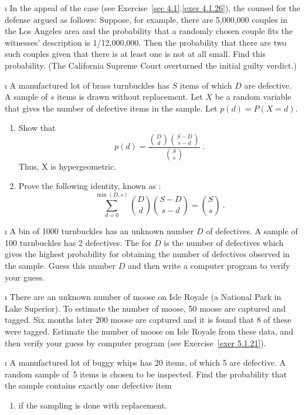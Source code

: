 \begin{LJSItem}
\i\label{exer 9.2.23} In the appeal of the   case (see Exercise~\ref{sec 4.1}.\ref{exer 4.1.26}),
the counsel for the defense argued as follows: Suppose, for example, there are 5{,}000{,}000
couples in the Los Angeles area and the probability that a randomly chosen couple fits the
witnesses' description is 1/12{,}000{,}000.  Then the probability that there are two such
couples given that there is at least one is not at all small.  Find this probability.  (The
California Supreme Court overturned the initial guilty verdict.)


\i\label{exer 5.1.20} A manufactured lot of brass turnbuckles has $S$ items of
which $D$ are defective.  A sample of $s$ items is drawn without replacement.  Let $X$
be a random variable that gives the number of defective items in the sample.  Let
$p(d) = P(X = d)$.

\begin{enumerate}
\item Show that
$$ p(d) = \frac{{D \choose d} {{S - D} \choose {s - d}}}{{S \choose s}}\ .
$$ Thus, X is hypergeometric.

\item Prove the following identity, known as  :
$$
\sum_{d = 0}^{\min(D,s)}{ D \choose d}   {{S - D} \choose {s - d}} =  {S \choose s}\ .
$$
\end{enumerate}

\i\label{exer 5.1.21} A bin of 1000 turnbuckles has an unknown number
$D$ of defectives.  A sample of 100 turnbuckles has 2 defectives.  The   for $D$ is the number of defectives
which gives the highest probability for obtaining the number of defectives observed in the
sample.  Guess this number $D$ and then write a computer program to verify your guess.

\i\label{exer 5.1.22} There are an unknown number of moose on Isle
Royale (a National Park in Lake Superior).  To estimate the number of moose,
50 moose are captured and tagged.  Six months later 200 moose are captured and it is found that
8 of these were tagged.  Estimate the number of moose on Isle Royale from these data,
and then verify your guess by computer program (see Exercise~\ref{exer 5.1.21}).

\i\label{exer 5.1.23} A manufactured lot of buggy whips has 20 items, of which 5
are defective.  A random sample of~5 items is chosen to be inspected.  Find the
probability that the sample contains exactly one defective item
\begin{enumerate}
\item if the sampling is done with replacement.


\end{enumerate}
\end{LJSItem}
